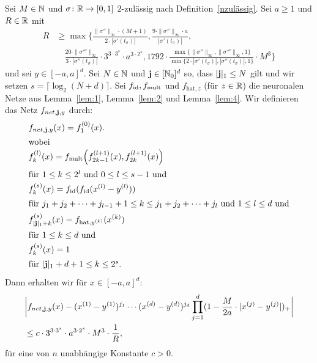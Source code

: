 \begin{lem}
\label{lem:5}
Sei $M \in \mathbb{N}$ und $\sigma\colon \mathbb{R} \to [0, 1]$ $2$-zulässig nach Definition~\ref{nzulässig}.
Sei $a \geq 1$ und $R \in \mathbb{R}$ mit
\begin{equation*}
\begin{split}
R & \geq \max\biggl\{\frac{\|\sigma''\|_{\infty} \cdot (M + 1)}{2 \cdot |\sigma'(t_{\sigma})|}, \frac{9 \cdot \|\sigma''\|_{\infty} \cdot a}{|\sigma'(t_{\sigma})|}, \\
& \quad \frac{20 \cdot \|\sigma'''\|_{\infty}}{3 \cdot |\sigma''(t_{\sigma})|} \cdot 3^{3 \cdot 3^s} \cdot a^{3 \cdot 2^s}, 1792 \cdot \frac{\max\{\|\sigma''\|_{\infty},\|\sigma'''\|_{\infty}, 1\}}{\min\{2 \cdot |\sigma'(t_{\sigma})|, |\sigma''(t_{\sigma})|, 1\}} \cdot M^3 \biggr\}
\end{split}
\end{equation*}
und sei $y \in [-a, a]^d.$ Sei $N \in \mathbb{N}$ und $\mathbf{j} \in [\mathbb{N}_0]^d$ so, dass $|\mathbf{j}|_1 \leq N$ gilt und wir setzen $s = \lceil\log_2(N + d)\rceil$. Sei $f_{\mathrm{id}}, f_{\mathrm{mult}}$ und $f_{\mathrm{hat}, z}$ (für $z \in \mathbb{R}$) die neuronalen Netze aus Lemma~\ref{lem:1}, Lemma~\ref{lem:2} und Lemma~\ref{lem:4}. Wir definieren das Netz $f_{net,\mathbf{j},y}$ durch:
\begin{align*}
\label{fnet}
& f_{net,\mathbf{j},y}(x) = f_1^{(0)}(x). \\
\intertext{wobei} 
& f_k^{(l)}(x) = f_{\mathrm{mult}}\Big(f_{2k - 1}^{(l + 1)}(x),f_{2k}^{(l + 1)}(x)\Big) \\
\intertext{für $1 \leq k \leq 2^l$ und $0 \leq l \leq s - 1$ und} 
& f_k^{(s)}(x) = f_{\mathrm{id}}(f_{\mathrm{id}}(x^{(l)} - y^{(l)}))  \\
\intertext{für $j_1 + j_2 + \dots + j_{l-1} + 1 \leq k \leq j_1 + j_2 + \dots + j_l$ und $1 \leq l \leq d$ und} 
& f_{|\mathbf{j}|_1 + k}^{(s)}(x) = f_{\mathrm{hat},y^{(k)}}(x^{(k)}) \\
\intertext{für $1 \leq k \leq d$ und} 
& f_k^{(s)}(x) = 1 \\
\intertext{für $|\mathbf{j}|_1+ d + 1 \leq k \leq 2^s.$}
\end{align*} 
Dann erhalten wir für $x \in [-a, a]^d$:
\begin{equation*}
\begin{split}
& \bigg|f_{net,\mathbf{j},y}(x) - (x^{(1)} - y^{(1)})^{j_1} \cdots (x^{(d)} - y^{(d)})^{j_d} \prod_{j = 1}^d (1 - \frac{M}{2a} \cdot |x^{(j)} - y^{(j)}|)_+\bigg| \\
& \leq c \cdot 3^{3 \cdot 3^s} \cdot a^{3 \cdot 2^s} \cdot M^3 \cdot \frac{1}{R},
\end{split}
\end{equation*}
für eine von $n$ unabhängige Konstante $c > 0$.
\end{lem}

